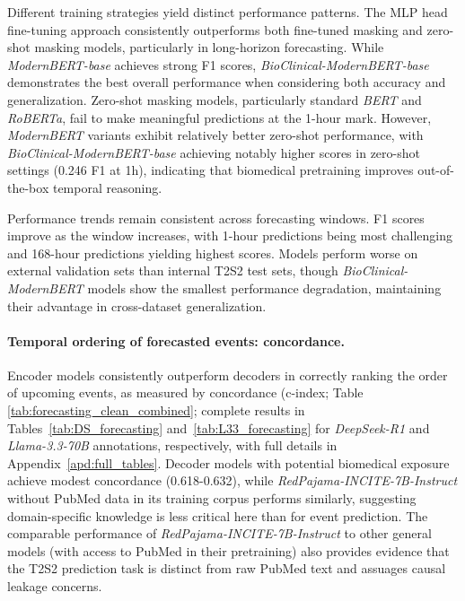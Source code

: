 Different training strategies yield distinct performance patterns. The MLP head fine-tuning approach consistently outperforms both fine-tuned masking and zero-shot masking models, particularly in long-horizon forecasting. While \textit{ModernBERT-base} achieves strong F1 scores, \textit{BioClinical-ModernBERT-base} demonstrates the best overall performance when considering both accuracy and generalization. Zero-shot masking models, particularly standard \textit{BERT} and \textit{RoBERTa}, fail to make meaningful predictions at the 1-hour mark. However, \textit{ModernBERT} variants exhibit relatively better zero-shot performance, with \textit{BioClinical-ModernBERT-base} achieving notably higher scores in zero-shot settings (0.246 F1 at 1h), indicating that biomedical pretraining improves out-of-the-box temporal reasoning.

Performance trends remain consistent across forecasting windows. F1 scores improve as the window increases, with 1-hour predictions being most challenging and 168-hour predictions yielding highest scores. Models perform worse on external validation sets than internal T2S2 test sets, though \textit{BioClinical-ModernBERT} models show the smallest performance degradation, maintaining their advantage in cross-dataset generalization.

\paragraph{Temporal ordering of forecasted events: concordance.}

Encoder models consistently outperform decoders in correctly ranking the order of upcoming events, as measured by concordance (c-index; Table \ref{tab:forecasting_clean_combined}; complete results in Tables~\ref{tab:DS_forecasting} and~\ref{tab:L33_forecasting} for \textit{DeepSeek-R1} and \textit{Llama-3.3-70B} annotations, respectively, with full details in Appendix~\ref{apd:full_tables}. Decoder models with potential biomedical exposure achieve modest concordance (0.618-0.632), while \textit{RedPajama-INCITE-7B-Instruct} without PubMed data in its training corpus performs similarly, suggesting domain-specific knowledge is less critical here than for event prediction. The comparable performance of \textit{RedPajama-INCITE-7B-Instruct} to other general models (with access to PubMed in their pretraining) also provides evidence that the T2S2 prediction task is distinct from raw PubMed text and assuages causal leakage concerns.

